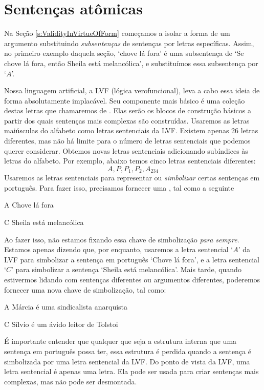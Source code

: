 \section{Sentenças atômicas}

Na Seção \ref{s:ValidityInVirtueOfForm} começamos a isolar a forma de um argumento substituindo \emph{subsentenças} de sentenças por letras específicas.
Assim, no primeiro exemplo daquela seção, `chove lá fora' é uma subsentença de `Se chove lá fora, então Sheila está melancólica', e substituímos essa subsentença por `$A$'.

Nossa linguagem artificial, a LVF (lógica verofuncional), leva a cabo essa ideia de forma absolutamente implacável.
Seu componente mais básico é uma coleção destas letras que chamaremos de .
Elas serão os blocos de construção básicos a partir dos quais sentenças mais complexas são construídas.
Usaremos as letras maiúsculas do alfabeto como letras sentenciais da LVF.
Existem apenas 26 letras diferentes, mas não há limite para o número de letras sentenciais que podemos querer considerar.
Obtemos novas letras sentenciais adicionando subíndices às letras do alfabeto.
Por exemplo, abaixo temos cinco letras sentenciais diferentes:
	$$A, P, P_1, P_2, A_{234}$$
Usaremos as letras sentenciais para representar ou \emph{simbolizar} certas sentenças em português.
Para fazer isso, precisamos fornecer uma , tal como a seguinte
	\begin{ekey}
		\item[A] Chove lá fora
		\item[C] Sheila está melancólica
	\end{ekey}
Ao fazer isso, não estamos fixando essa chave de simbolização \emph{para sempre}.
Estamos apenas dizendo que, por enquanto, usaremos a letra sentencial `$A$'  da LVF para simbolizar a sentença em português `Chove lá fora', e a letra sentencial `$C$' para simbolizar a sentença `Sheila está melancólica'.
Mais tarde, quando estivermos lidando com sentenças diferentes ou argumentos diferentes, poderemos fornecer uma nova chave de simbolização, tal como:
	\begin{ekey}
		\item[A] Márcia é uma sindicalista anarquista
		\item[C] Sílvio é um ávido leitor de Tolstoi
	\end{ekey}
É importante entender que qualquer que seja a estrutura interna que uma sentença em português possa ter, essa estrutura é perdida quando a sentença é simbolizada por uma letra sentencial da LVF.
Do ponto de vista da LVF, uma letra sentencial é apenas uma letra.
Ela pode ser usada para criar sentenças mais complexas, mas não pode ser desmontada.

